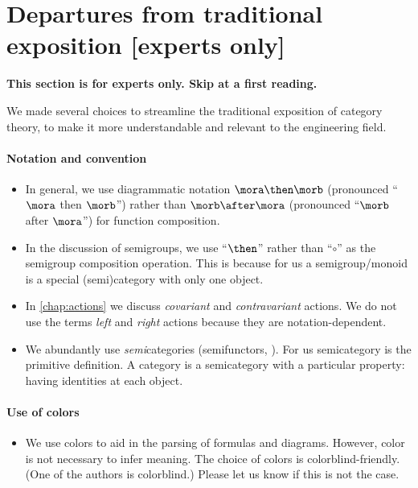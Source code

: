
\section[Departures from tradition]{Departures from traditional exposition [experts only]}

\textbf{This section is for experts only.
    Skip at a first reading.
}

We made several choices to streamline the traditional exposition of category theory, to make it more understandable and relevant to the engineering field.

\paragraph{Notation and convention}
\begin{itemize}
    \item In general, we use diagrammatic notation $\mora \then \morb$ (pronounced ``$\mora$ then $\morb$'') rather than $\morb \after \mora$ (pronounced ``$\morb$ after $\mora$'') for function composition.
    \item In the discussion of semigroups, we use ``$\then$'' rather than ``$\circ$'' as the semigroup composition operation.
          This is because for us a semigroup/monoid is a special (semi)category with only one object.
    \item In \cref{chap:actions} we discuss \emph{covariant} and \emph{contravariant} actions.
          We do not use the terms \emph{left} and \emph{right} actions because they are notation-dependent.
    \item We abundantly use \emph{semi}categories (semifunctors, \etc).
          For us semicategory is the primitive definition.
          A category is a semicategory with a particular property: having identities at each object.
\end{itemize}

\paragraph{Use of colors}
\begin{itemize}
    \item We use colors to aid in the parsing of formulas and diagrams.
          However, color is not necessary to infer meaning.
          The choice of colors is colorblind-friendly.
          (One of the authors is colorblind.)
          Please let us know if this is not the case.
\end{itemize}

